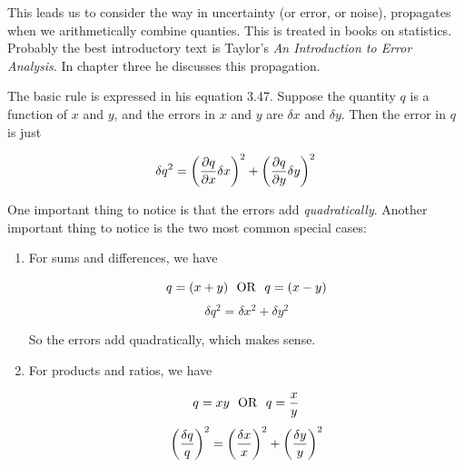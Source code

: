 \documentclass[preprint]{aastex}
\begin{document}
	This leads us to consider the way in uncertainty (or error,
or noise), propagates when we arithmetically combine quanties. This is
treated in books on statistics. Probably the best introductory text is
Taylor's {\it An Introduction to Error Analysis}. In chapter three he
discusses this propagation. 

	The basic rule is expressed in his equation 3.47. Suppose the
quantity $q$ is a function of $x$ and $y$, and the errors in $x$ and $y$
are $\delta x$ and $\delta y$. Then the error in $q$ is just

\begin{equation}
\delta q^2 = \left( {\partial q \over \partial x} \delta x \right)^2
 + \left( {\partial q \over \partial y} \delta y \right)^2
\end{equation}

\noindent One important thing to notice is that the errors add {\it
quadratically}. Another important thing to notice is the two most common
special cases: \begin{enumerate}

	\item For sums and differences, we have

\begin{mathletters}
\begin{equation} 
q = (x + y) \ \ {\rm OR} \ \ q = (x - y)
\end{equation}
\begin{equation} \label{sumprop}
\delta q^2 = \delta x^2 + \delta y^2
\end{equation}
\end{mathletters}

\noindent So the errors add quadratically, which makes sense. 

	\item For products and ratios, we have
 
\begin{mathletters}
\begin{equation} \label{productprop}
q = xy \ \ {\rm OR} \ \ q = {x \over y}
\end{equation}
\begin{equation} \label{errorproduct}
\left({\delta q \over q}\right)^2= \left( \delta x \over x \right)^2 + \left( \delta y \over y \right)^2 
\end{equation}
\end{mathletters}

\end{enumerate}
\end{document}

